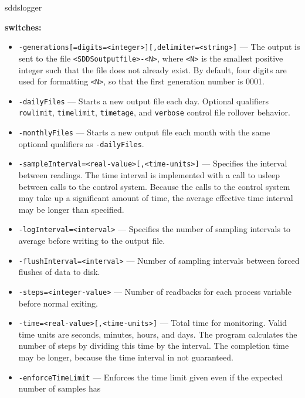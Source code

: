 \begin{sddsprog}{sddslogger}
\item {\bf switches:}
    \begin{itemize}
        \item {\verb+-generations[=digits=<integer>][,delimiter=<string>]+} ---
                The output is sent to the file \verb+<SDDSoutputfile>-<N>+, where \verb+<N>+ is
                the smallest positive integer such that the file does not already
                exist.  By default, four digits are used for formatting \verb+<N>+, so that
                the first generation number is 0001.
        \item {\tt -dailyFiles} --- Starts a new output file each day. Optional qualifiers
                \verb+rowlimit+, \verb+timelimit+, \verb+timetage+, and \verb+verbose+ control
                file rollover behavior.
        \item {\tt -monthlyFiles} --- Starts a new output file each month with the same optional
                qualifiers as \verb+-dailyFiles+.
        \item {\tt -sampleInterval=<real-value>[,<time-units>]} --- Specifies the interval between readings. The time
                interval is implemented with a call to usleep between calls to the control system.
                Because the calls to the control system may take up a significant amount of time, the average
                effective time interval may be longer than specified. 
        \item {\tt -logInterval=<interval>} --- Specifies the number of sampling intervals to average before
                writing to the output file.
        \item {\tt -flushInterval=<interval>} --- Number of sampling intervals between forced flushes of data to disk.
        \item {\tt -steps=<integer-value>} --- Number of readbacks for each process variable before normal exiting.
        \item {\tt -time=<real-value>[,<time-units>]} --- Total time for monitoring. Valid time units are
                seconds, minutes, hours, and days. The program calculates the number of steps by dividing this time
                by the interval. The completion time may be longer, because the time interval in not guaranteed.
        \item {\tt -enforceTimeLimit} --- Enforces the time limit given even if the expected number of samples has

\end{itemize}
\end{sddsprog}
